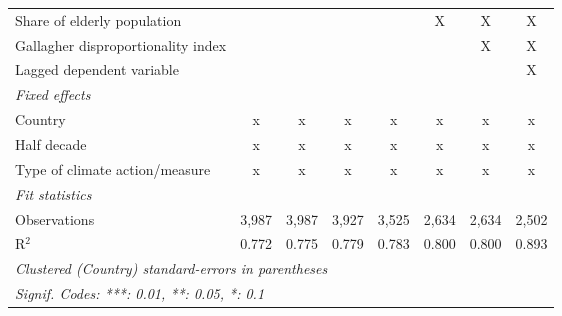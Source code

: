 \begin{table}[htbp]
\begin{tabular}{lccccccc}
      Share of elderly population                                       &         &         &              &               & X              & X              & X\\  
      Gallagher disproportionality index                                &         &         &              &               &                & X              & X\\  
      Lagged dependent variable                                         &         &         &              &               &                &                & X\\  
      \emph{Fixed effects}\\
      Country                                                           & x       & x       & x            & x             & x              & x              & x\\  
      Half decade                                                       & x       & x       & x            & x             & x              & x              & x\\  
      Type of climate action/measure                                    & x       & x       & x            & x             & x              & x              & x\\  
      \midrule \emph{Fit statistics}\\
      Observations                                                      & 3,987   & 3,987   & 3,927        & 3,525         & 2,634          & 2,634          & 2,502\\  
      R$^2$                                                             & 0.772   & 0.775   & 0.779        & 0.783         & 0.800          & 0.800          & 0.893\\  
      \midrule
      \multicolumn{8}{l}{\emph{Clustered (Country) standard-errors in parentheses}}\\
      \multicolumn{8}{l}{\emph{Signif. Codes: ***: 0.01, **: 0.05, *: 0.1}}\\
   \end{tabular}
\end{table}


